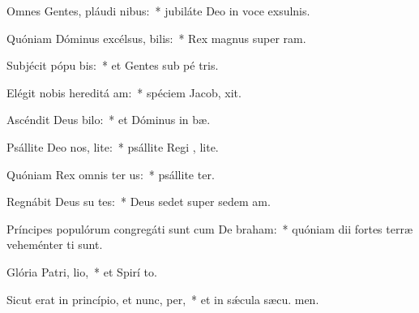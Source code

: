 \item Omnes Gentes, pláudi nibus:~* jubiláte Deo in voce exsulnis.
\item Quóniam Dóminus excélsus, bilis:~* Rex magnus super  ram.
\item Subjécit pópu bis:~* et Gentes sub pé tris.
\item Elégit nobis hereditá am:~* spéciem Jacob,  xit.
\item Ascéndit Deus  bilo:~* et Dóminus in  bæ.
\item Psállite Deo nos, lite:~* psállite Regi , lite.
\item Quóniam Rex omnis ter us:~* psállite ter.
\item Regnábit Deus su tes:~* Deus sedet super sedem  am.
\item Príncipes populórum congregáti sunt cum De braham:~* quóniam dii fortes terræ veheménter ti sunt.
\item Glória Patri,  lio,~* et Spirí to.
\item Sicut erat in princípio, et nunc,  per,~* et in sǽcula sæcu. men.
